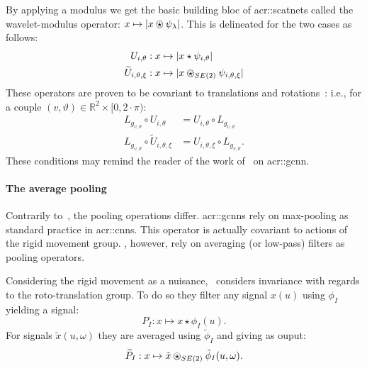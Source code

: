                 By applying a modulus we get the basic building bloc of \glspl{acr::scatnet} called the wavelet-modulus operator: $x \mapsto \vert x\ostar\psi_{\lambda} \vert$.
                This is delineated for the two cases as follows:
                \begin{align}
                    \label{eq::wavelet-modulus_1_2}
                    U_{i, \theta}: x &\mapsto \vert x\star\psi_{i, \theta}\vert\\
                    \widetilde{U}_{i, \theta, \xi}: x &\mapsto \vert x\ostar_{SE(2)}\psi_{i, \theta, \xi} \vert
                \end{align}
                These operators are proven to be covariant to translations and rotations~\parencite{mallat2012group,sifre2013rotation}: i.e., for a couple $(v, \vartheta) \in \mathbb{R}^2 \times [0, 2\cdot\pi)$:
                \begin{align}
                    \label{eq::covariance_wavelet-modulus}
                    L_{g_{v, \vartheta}} \circ U_{i, \theta} &= U_{i, \theta} \circ L_{g_{v, \vartheta}}\\
                    L_{g_{v, \vartheta}} \circ \widetilde{U}_{i, \theta, \xi} &= U_{i, \theta, \xi} \circ L_{g_{v, \vartheta}}.
                \end{align}
                These conditions may remind the reader of the work of~\textcite{cohen2016group} on \gls{acr::gcnn}.
            
            \paragraph{The average pooling}
                Contrarily to~\parencite{cohen2016group}, the pooling operations differ.
                \glspl{acr::gcnn} rely on max-pooling as standard practice in \glspl{acr::cnn}.
                This operator is actually covariant to actions of the rigid movement group.
                \parencite{bruna2013invariant, sifre2013rotation,oyallon2015deep}, however, rely on averaging (or low-pass) filters as pooling operators.

                Considering the rigid movement as a nuisance,~\parencite{sifre2013rotation} considers invariance with regards to the roto-translation group.
                To do so they filter any signal $x(u)$ using $\phi_I$ yielding a signal:
                \begin{equation}
                    \label{eq::pool_bi-dim}
                    P_I: x \mapsto x \star \phi_I (u).
                \end{equation}
                For signals $\tilde{x}(u, \omega)$ they are averaged using $\tilde{\phi}_I$ and giving as ouput:
                \begin{equation}
                    \label{eq::pool_bi-dim-angular}
                    \widetilde{P}_I: x \mapsto \tilde{x} \ostar_{SE(2)} \tilde{\phi}_I (u, \omega).
                \end{equation}

